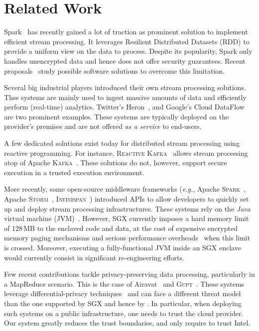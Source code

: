 \section{Related Work}\label{sec:rw}


Spark~\cite{Zaharia:2013:DSF:2517349.2522737} has recently gained a lot of traction as prominent solution to implement efficient stream processing.
It leverages Resilient Distributed Datasets (RDD) to provide a uniform view on the data to process.
Despite its popularity, Spark only handles unencrypted data and hence does not offer security guarantees.
Recent proposals~\cite{7840754} study possible software solutions to overcome this limitation.

Several big industrial players introduced their own stream processing solutions.
Thse systems are mainly used to ingest massive amounts of data and efficiently perform (real-time) analytics.
Twitter's Heron~\cite{Kulkarni:2015:THS:2723372.2742788}, and Google's Cloud DataFlow~\cite{Akidau:2015:DMP:2824032.2824076} are two prominent examples.
These systems are typically deployed on the provider's premises and are not offered \emph{as a service} to end-users.

A few dedicated solutions exist today for distributed stream processing using reactive programming.
For instance, \textsc{Reactive Kafka}~\cite{reactivekafka} allows stream processing atop of Apache \textsc{Kafka}~\cite{apachekafka}.
These solutions do not, however, support secure execution in a trusted execution environment.

More recently, some open-source middleware frameworks (\emph{e.g.}, Apache \textsc{Spark}~\cite{apachesparkstreaming}, Apache \textsc{Storm}~\cite{apachestorm}, \textsc{Infinispan}~\cite{infinispan}) introduced APIs to allow developers to quickly set up and deploy stream processing infrastructures.
These systems rely on the \emph{Java} virtual machine (JVM)~\cite{lindholm2014java}.
However, SGX currently imposes a hard memory limit of 128\,MB to the enclaved code and data, at the cost of expensive encrypted memory paging mechanisms and serious performance overheads~\cite{pires_scbr:2016,brenner_securekeeper:_2016} when this limit is crossed.
Moreover, executing a fully-functional JVM inside an SGX enclave would currently consist in significant re-engineering efforts.

Few recent contributions tackle privacy-preserving data processing, particularly in a MapReduce scenario.
This is the case of Airavat~\cite{Roy:2010:ASP:1855711.1855731} and \textsc{Gupt}~\cite{Mohan:2012:GPP:2213836.2213876}.
These systems leverage differential-privacy techniques~\cite{dwork2006calibrating} and can face a different threat model than the one supported by SGX and hence by \SYS.
In particular, when deploying such systems on a public infrastructure, one needs to trust the cloud provider.
Our system greatly reduces the trust boundaries, and only require to trust Intel.

